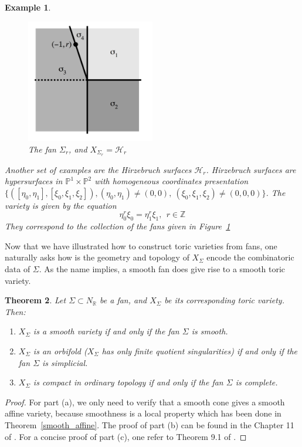 \documentclass[11pt]{article}
\newtheorem{thm}{Theorem}[section]
\newtheorem{ex}[thm]{Example}
\begin{document}
\begin{ex}
\begin{figure}
	\centering
	\includegraphics[width = 0.5\textwidth]{Hirzebruch}
	\caption{The fan $\Sigma_r$, and $X_{\Sigma_r}=\mathcal{H}_r$}\label{fig:fan}
\end{figure}
Another set of examples are the Hirzebruch surfaces $\mathcal{H}_r$. Hirzebruch surfaces are hypersurfaces in $\mathbb{P}^1\times \mathbb{P}^2$ with homogeneous coordinates presentation $\{([\eta_0,\eta_1],[\xi_0,\xi_1,\xi_2]),(\eta_0,\eta_1)\neq(0,0),\ (\xi_0,\xi_1,\xi_2)\neq(0,0,0)\}$. The variety is given by the equation
$$
	\eta_0^r\xi_0=\eta_1^r\xi_1,\ \  r\in \mathbb{Z}$$
They correspond to the collection of the fans given in Figure~\ref{fig:fan}
\end{ex}

Now that we have illustrated how to construct toric varieties from fans, one naturally asks how is the geometry and topology of $X_{\Sigma}$ encode the combinatoric data of $\Sigma$. As the name implies, a smooth fan does give rise to a smooth toric variety. 
\begin{thm}
	Let $\Sigma\subset N_{\mathbb{R}}$ be a fan, and $X_{\Sigma}$ be its corresponding toric variety. Then:
	\begin{enumerate}[label=(\alph*)]
		\item $X_\Sigma$ is a smooth variety if and only if the fan $\Sigma$ is smooth.
		\item $X_\Sigma$ is an orbifold ($X_{\Sigma}$ has only finite quotient singularities) if and only if the fan $\Sigma$ is simplicial.
		\item $X_\Sigma$ is compact in ordinary topology if and only if the fan $\Sigma$ is complete.
	\end{enumerate}
\end{thm}
\begin{proof}
For part (a), we only need to verify that a smooth cone gives a smooth affine variety, because smoothness is a local property which has been done in Theorem~\ref{smooth_affine}.
The proof of  part (b) can be found in the Chapter 11 of \cite{cox2009toric}.
For a concise proof of part (c), one refer to Theorem 9.1 of \cite{ewald2012combinatorial}.  
\end{proof}
\end{document}

